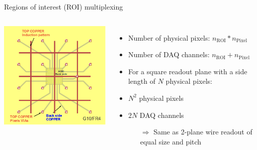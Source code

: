 \documentclass[]{beamer}
\newcommand*{\m}{\mathrm}
\newcommand*{\emphcol}{red}
\begin{document}
\begin{frame}{Regions of interest (ROI) multiplexing}
	\begin{columns}[c]
		\centering
		\includegraphics[width=\textwidth]{defence/roi}
		\begin{itemize}
			\item Number of physical pixels: {\color{\emphcol} $n_{\m{ROI}} * n_{\m{Pixel}}$}
			\item Number of DAQ channels: {\color{\emphcol} $n_{\m{ROI}} + n_{\m{Pixel}}$}
			\item For a square readout plane with a side length of $N$ physical pixels:
			\item $N ^ 2$ physical pixels
			\item $2 N$ DAQ channels
			\begin{itemize}
				\item[$\Rightarrow$] Same as 2-plane wire readout of equal size and pitch
			\end{itemize}
		\end{itemize}
	\end{columns}
\end{frame}
\end{document}
